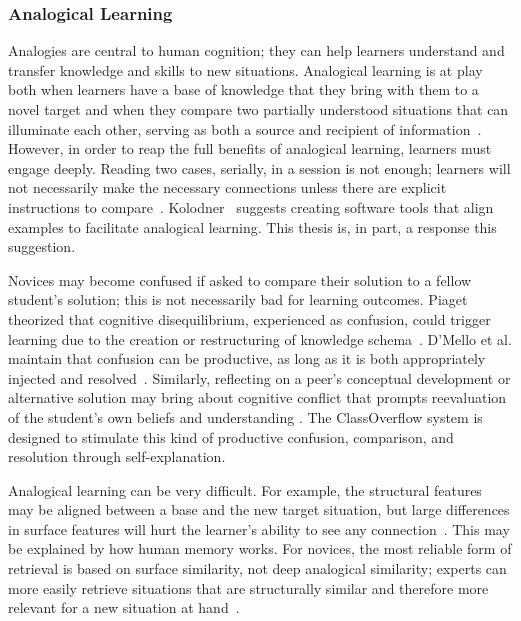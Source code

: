 \subsubsection{Analogical Learning}

Analogies are central to human cognition; they can help learners understand and transfer knowledge and skills to new situations. Analogical learning is at play both when learners have a base of knowledge that they bring with them to a novel target and when they compare two partially understood situations that can illuminate each other, serving as both a source and recipient of information~\cite{kurtz01learning,loewenstein2003analogical}. However, in order to reap the full benefits of analogical learning, learners must engage deeply. Reading two cases, serially, in a session is not enough; learners will not necessarily make the necessary connections unless there are explicit instructions to compare~\cite{loewenstein2003analogical,catrambone1989overcoming}. Kolodner~\cite{Kolodner} suggests creating software tools that align examples to facilitate analogical learning. This thesis is, in part, a response this suggestion.

Novices may become confused if asked to compare their solution to a fellow student's solution; this is not necessarily bad for learning outcomes. Piaget theorized that cognitive disequilibrium, experienced as confusion, could trigger learning due to the creation or restructuring of knowledge schema~\cite{disequilibrium}. D'Mello et al. maintain that confusion can be productive, as long as it is both appropriately injected and resolved~\cite{productiveconfusion}. Similarly, reflecting on a peer's conceptual development or alternative solution may bring about cognitive conflict that prompts reevaluation of the student's own beliefs and understanding \cite{kavanagh}. The ClassOverflow system is designed to stimulate this kind of productive confusion, comparison, and resolution through self-explanation. 

Analogical learning can be very difficult. For example, the structural features may be aligned between a base and the new target situation, but large differences in surface features will hurt the learner's ability to see any connection~\cite{Kurtz}. This may be explained by how human memory works. For novices, the most reliable form of retrieval is based on surface similarity, not deep analogical similarity; experts can more easily retrieve situations that are structurally similar and therefore more relevant for a new situation at hand~\cite{Loewenstein}.

